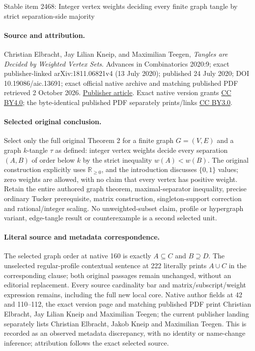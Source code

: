 \documentclass[11pt]{article}
\theoremstyle{definition}
\begin{document}
\begin{center}{\Large Stable item 2468: Integer vertex weights deciding every finite graph tangle by strict separation-side majority}\end{center}
\paragraph{Source and attribution.} Christian Elbracht, Jay Lilian Kneip, and Maximilian Teegen, \emph{Tangles are Decided by Weighted Vertex Sets}. Advances in Combinatorics 2020:9; exact publisher-linked arXiv:1811.06821v4 (13 July 2020); published 24 July 2020; DOI 10.19086/aic.13691; exact official native archive and matching published PDF retrieved 2 October 2026. \href{https://www.advancesincombinatorics.com/article/13691-tangles-are-decided-by-weighted-vertex-sets}{Publisher article}. Exact native version grants \href{https://creativecommons.org/licenses/by/4.0/}{CC BY4.0}; the byte-identical published PDF separately prints/links \href{https://creativecommons.org/licenses/by/3.0/}{CC BY3.0}.
\paragraph{Selected original conclusion.} Select only the full original Theorem 2 for a finite graph \(G=(V,E)\) and a graph \(k\)-tangle \(\tau\) as defined: integer vertex weights decide every separation \((A,B)\) of order below \(k\) by the strict inequality \(w(A)<w(B)\). The original construction explicitly uses \(\mathbb R_{\ge0}\), and the introduction discusses \(\{0,1\}\) values; zero weights are allowed, with no claim that every vertex has positive weight. Retain the entire authored graph theorem, maximal-separator inequality, precise ordinary Tucker prerequisite, matrix construction, singleton-support correction and rational/integer scaling. No unweighted-subset claim, profile or hypergraph variant, edge-tangle result or counterexample is a second selected unit.
\paragraph{Literal source and metadata correspondence.} The selected graph order at native 160 is exactly \(A\subseteq C\) and \(B\supseteq D\). The unselected regular-profile contextual sentence at 222 literally prints \(A\cup C\) in the corresponding clause; both original passages remain unchanged, without an editorial replacement. Every source cardinality bar and matrix/subscript/weight expression remains, including the full new local core. Native author fields at 42 and 110--112, the exact version page and matching published PDF print Christian Elbracht, Jay Lilian Kneip and Maximilian Teegen; the current publisher landing separately lists Christian Elbracht, Jakob Kneip and Maximilian Teegen. This is recorded as an observed metadata discrepancy, with no identity or name-change inference; attribution follows the exact selected source.
\end{document}
